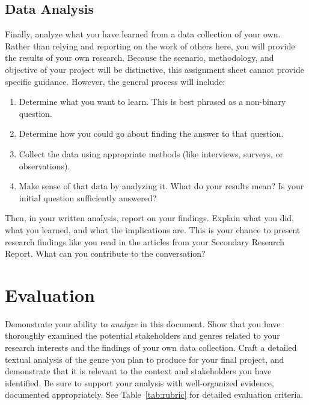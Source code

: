 \documentclass[10pt,oneside]{amsart}	%
\begin{document}
\subsection{Data Analysis} %
\label{sub:data_analysis}
Finally, analyze what you have learned from a data collection of your own. Rather than relying and reporting on the work of others here, you will provide the results of your own research. Because the scenario, methodology, and objective of your project will be distinctive, this assignment sheet cannot provide specific guidance. However, the general process will include:
\begin{enumerate}
	\item Determine what you want to learn. This is best phrased as a non-binary question.
	\item Determine how you could go about finding the answer to that question.
	\item Collect the data using appropriate methods (like interviews, surveys, or observations).
	\item Make sense of that data by analyzing it. What do your results mean? Is your initial question sufficiently answered?
\end{enumerate}

Then, in your written analysis, report on your findings. Explain what you did, what you learned, and what the implications are. This is your chance to present research findings like you read in the articles from your Secondary Research Report. What can you contribute to the conversation?



\section{Evaluation} %
\label{sec:eval}
Demonstrate your ability to \emph{analyze} in this document. Show that you have thoroughly examined the potential stakeholders and genres related to your research interests and the findings of your own data collection. Craft a detailed textual analysis of the genre you plan to produce for your final project, and demonstrate that it is relevant to the context and stakeholders you have identified. Be sure to support your analysis with well-organized evidence, documented appropriately. See Table~\ref{tab:rubric} for detailed evaluation criteria.
\end{document}
